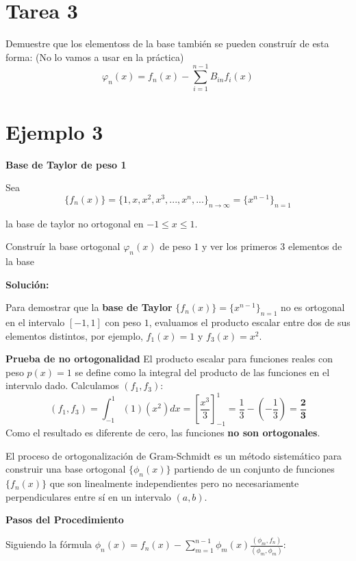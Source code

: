 \documentclass[a4paper]{article}
\begin{document}
\section{Tarea 3}
Demuestre que los elementoss de la base también se pueden construír de esta forma: (No lo vamos a usar en la práctica)
$$\varphi_n(x) = f_n(x) - \sum_{i=1}^{n-1} B_{in}f_i(x)$$


\section{Ejemplo 3}

\textbf{Base de Taylor de peso 1}

Sea $$\{f_n(x)\} = \{1, x, x^2, x^3,..., x^n,...\}_{n\to\infty} = \{x^{n-1}\}_{n=1}$$

la base de taylor no ortogonal en $-1\leq x\leq 1$. 

Construír la base ortogonal $\varphi_n(x)$ de peso $1$ y ver los primeros 3 elementos de la base


\textbf{Solución:}

Para demostrar que la \textbf{base de Taylor} $\{f_n(x)\} = \{x^{n-1}\}_{n=1}$ no es ortogonal en el intervalo $[-1, 1]$ con peso $1$, evaluamos el producto escalar entre dos de sus elementos distintos, por ejemplo, $f_1(x) = 1$ y $f_3(x) = x^2$.

\textbf{Prueba de no ortogonalidad}
El producto escalar para funciones reales con peso $p(x)=1$ se define como la integral del producto de las funciones en el intervalo dado.
Calculamos $(f_1, f_3)$:
$$(f_1, f_3) = \int_{-1}^{1} (1)(x^2) dx = \left[ \frac{x^3}{3} \right]_{-1}^{1} = \frac{1}{3} - \left( -\frac{1}{3} \right) = \mathbf{\frac{2}{3}}$$
Como el resultado es diferente de cero, las funciones \textbf{no son ortogonales}.

El proceso de ortogonalización de Gram-Schmidt es un método sistemático para construir una base ortogonal $\{\phi_n(x)\}$ partiendo de un conjunto de funciones $\{f_n(x)\}$ que son linealmente independientes pero no necesariamente perpendiculares entre sí en un intervalo $(a, b)$.


\textbf{Pasos del Procedimiento}

Siguiendo la fórmula $\phi_n(x) = f_n(x) - \sum_{m=1}^{n-1} \phi_m(x) \frac{(\phi_m, f_n)}{(\phi_m, \phi_m)}$:
\end{document}
